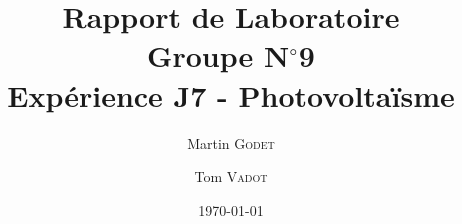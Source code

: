 \documentclass[a4paper, 12pt, oneside]{article}
\begin{document}
\title{Rapport de Laboratoire\\Groupe N$^\circ$9\\Expérience J7 - Photovoltaïsme}
\author{Martin \textsc{Godet} \and Tom \textsc{Vadot}}
\date{\today}

\maketitle








\nocite{*}  %
\printbibliography

\newpage

\begin{appendices}

\end{appendices}
\end{document}
